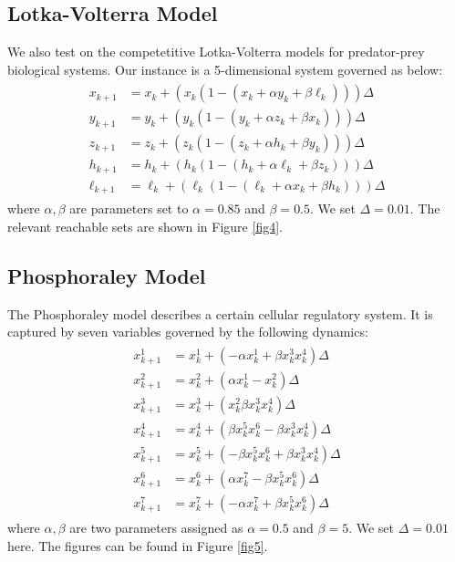\documentclass[EPiC]{easychair}
\begin{document}

\subsection{Lotka-Volterra Model}
\noindent We also test on the competetitive Lotka-Volterra models for predator-prey biological systems. Our instance is a 5-dimensional system governed as below:
\begin{align}
    \begin{split}
        x_{k+1} &= x_k + (x_k(1 - (x_k + \alpha y_k + \beta \ell_k))) \Delta \\
        y_{k+1} &= y_k + (y_k(1 - (y_k + \alpha z_k + \beta x_k))) \Delta \\
        z_{k+1} &= z_k + (z_k(1 - (z_k + \alpha h_k + \beta y_k))) \Delta \\
        h_{k+1} &= h_k + (h_k(1 - (h_k + \alpha \ell_k + \beta z_k))) \Delta \\
        \ell_{k+1} &= \ell_k + (\ell_k(1 - (\ell_k + \alpha x_k + \beta h_k))) \Delta
    \end{split}
\end{align}
where $\alpha,\beta$ are parameters set to $\alpha=0.85$ and $\beta=0.5$. We set $\Delta = 0.01$.
The relevant reachable sets are shown in Figure \ref{fig4}.

\subsection{Phosphoraley Model}
The Phosphoraley model describes a certain cellular regulatory system. It is captured by seven variables governed by the following dynamics:
\begin{align}
    \begin{split}
        x^1_{k+1} &= x^1_k + ( -\alpha x^1_k + \beta x^3_k x^4_k)\Delta \\
        x^2_{k+1} &= x^2_k + (  \alpha x^1_k - x^2_k)\Delta \\
        x^3_{k+1} &= x^3_k + ( x^2_k \beta x^3_k x^4_k)\Delta \\
        x^4_{k+1} &= x^4_k + ( \beta x^5_k x^6_k - \beta x^3_k x^4_k)\Delta \\
        x^5_{k+1} &= x^5_k + ( -\beta x^5_k x^6_k + \beta x^3_k x^4_k)\Delta \\
        x^6_{k+1} &= x^6_k + ( \alpha x^7_k - \beta x^5_k x^6_k)\Delta \\
        x^7_{k+1} &= x^7_k + ( -\alpha x^7_k + \beta x^5_k x^6_k)\Delta
    \end{split}
\end{align}
where $\alpha,\beta$ are two parameters assigned as $\alpha=0.5$ and $\beta=5$. We set $\Delta =0.01$ here. The figures can be found in Figure \ref{fig5}.
\end{document}
